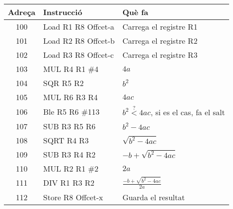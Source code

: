 \documentclass[border=2]{standalone}
\begin{document}
\begin{tabular}
{|c|l|l|}\hline
Adreça	& Instrucció	&	Què fa	\\\hline\hline
100	& Load R1 R8 Offcet-a	& Carrega el registre R1\\\hline
101	& Load R2 R8 Offcet-b	& Carrega el registre R2\\\hline
102	& Load R3 R8 Offcet-c	& Carrega el registre R3\\\hline
103	& MUL R4 R1 \#4		& $4a$\\\hline
104	& SQR R5 R2		& $b^2$\\\hline
105	& MUL R6 R3 R4		& $4ac$\\\hline
106	& Ble R5 R6 \#113	& $b^2 \overset{?}{<} 4ac$, si es el cas, fa el salt\\\hline
107	& SUB R3 R5 R6		& $b^2 - 4ac$\\\hline
108	& SQRT R4 R3		& $\sqrt{b^2 - 4ac}$\\\hline
109	& SUB R3 R4 R2		& $-b + \sqrt{b^2 - 4ac}$\\\hline
110	& MUL R2 R1 \#2		& $2a$\\\hline
111	& DIV R1 R3 R2		& $\frac{-b + \sqrt{b^2 - 4ac}}{2a}$\\\hline
112	& Store R8 Offcet-x	& Guarda el resultat\\\hline
\end{tabular}
\end{document}
